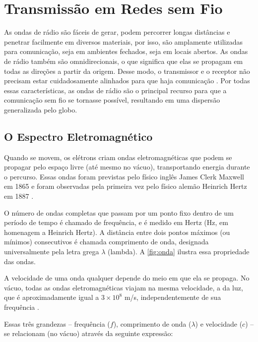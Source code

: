 \chapter{Transmissão em Redes sem Fio}
\label{cap:transmissao-redes-sem-fio}

As ondas de rádio são fáceis de gerar, podem percorrer longas distâncias e penetrar facilmente em diversos materiais, por isso, são amplamente utilizadas para comunicação, seja em ambientes fechados, seja em locais abertos. As ondas de rádio também são omnidirecionais, o que significa que elas se propagam em todas as direções a partir da origem. Desse modo, o transmissor e o receptor não precisam estar cuidadosamente alinhados para que haja comunicação \cite{tanenbaum2011}. Por todas essas características, as ondas de rádio são o principal recurso para que a comunicação sem fio se tornasse possível, resultando em uma dispersão generalizada pelo globo.

\section{O Espectro Eletromagnético}
\label{sec:espectro-eletromagnetico}

Quando se movem, os elétrons criam ondas eletromagnéticas que podem se propagar pelo espaço livre (até mesmo no vácuo), transportando energia durante o percurso. Essas ondas foram previstas pelo físico inglês James Clerk Maxwell em 1865 e foram observadas pela primeira vez pelo físico alemão Heinrich Hertz em 1887 \cite{tanenbaum2011}.

O número de ondas completas que passam por um ponto fixo dentro de um período de tempo é chamado de frequência, e é medido em Hertz (Hz, em homenagem a Heinrich Hertz). A distância entre dois pontos máximos (ou mínimos) consecutivos é chamada comprimento de onda, designada universalmente pela letra grega $\lambda$ (lambda). A \autoref{fig:onda} ilustra essa propriedade das ondas.

A velocidade de uma onda qualquer depende do meio em que ela se propaga. No vácuo, todas as ondas eletromagnéticas viajam na mesma velocidade, a da luz, que é aproximadamente igual a $3 \times 10^8$ m/s, independentemente de sua frequência \cite{tanenbaum2011}.

Essas três grandezas -- frequência ($f$), comprimento de onda ($\lambda$) e velocidade ($c$) -- se relacionam (no vácuo) através da seguinte expressão:

